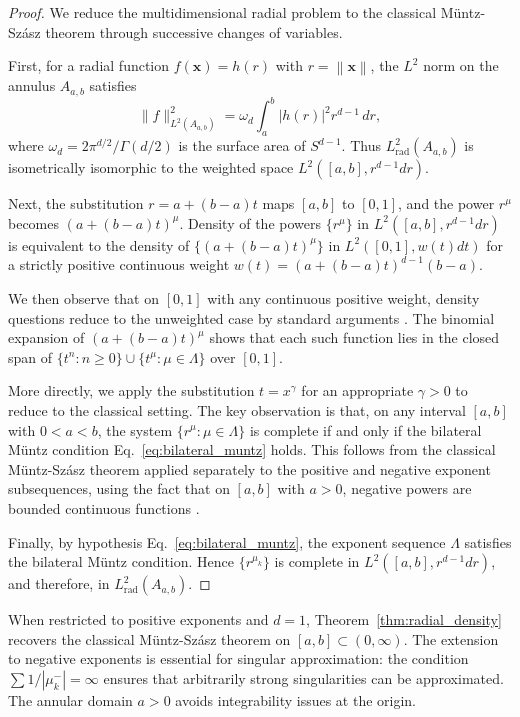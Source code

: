 \documentclass[twoside,11pt]{article}
\newcommand{\bx}{\bm{x}}
\newcommand{\norm}[1]{\left\|#1\right\|}
\renewcommand{\eqref}[1]{Eq.~\ref{#1}}
\begin{document}
\begin{proof}
	We reduce the multidimensional radial problem to the classical Müntz-Szász theorem through successive changes of variables.

	First, for a radial function $f(\bx) = h(r)$ with $r = \norm{\bx}$, the $L^2$ norm on the annulus $A_{a,b}$ satisfies
	\begin{equation}
		\|f\|_{L^2(A_{a,b})}^2 = \omega_d \int_a^b |h(r)|^2 r^{d-1} \, dr,
	\end{equation}
	where $\omega_d = 2\pi^{d/2}/\Gamma(d/2)$ is the surface area of $S^{d-1}$. Thus $L^2_{\mathrm{rad}}(A_{a,b})$ is isometrically isomorphic to the weighted space $L^2([a,b], r^{d-1} dr)$.

	Next, the substitution $r = a + (b-a)t$ maps $[a,b]$ to $[0,1]$, and the power $r^\mu$ becomes $(a + (b-a)t)^\mu$. Density of the powers $\{r^\mu\}$ in $L^2([a,b], r^{d-1} dr)$ is equivalent to the density of $\{(a + (b-a)t)^\mu\}$ in $L^2([0,1], w(t) dt)$ for a strictly positive continuous weight $w(t) = (a + (b-a)t)^{d-1}(b-a)$.

	We then observe that on $[0,1]$ with any continuous positive weight, density questions reduce to the unweighted case by standard arguments \citep[Chapter II]{borwein1995polynomials}. The binomial expansion of $(a + (b-a)t)^\mu$ shows that each such function lies in the closed span of $\{t^n : n \geq 0\} \cup \{t^\mu : \mu \in \Lambda\}$ over $[0,1]$.

	More directly, we apply the substitution $t = x^\gamma$ for an appropriate $\gamma > 0$ to reduce to the classical setting. The key observation is that, on any interval $[a,b]$ with $0 < a < b$, the system $\{r^\mu : \mu \in \Lambda\}$ is complete if and only if the bilateral Müntz condition \eqref{eq:bilateral_muntz} holds. This follows from the classical Müntz-Szász theorem applied separately to the positive and negative exponent subsequences, using the fact that on $[a,b]$ with $a > 0$, negative powers are bounded continuous functions \citep{borwein1995polynomials,almira2007muntz}.

	Finally, by hypothesis \eqref{eq:bilateral_muntz}, the exponent sequence $\Lambda$ satisfies the bilateral Müntz condition. Hence $\{r^{\mu_k}\}$ is complete in $L^2([a,b], r^{d-1} dr)$, and therefore, in $L^2_{\mathrm{rad}}(A_{a,b})$.
\end{proof}

\begin{remark}
	\label{rem:classical_relation}
	When restricted to positive exponents and $d = 1$, Theorem~\ref{thm:radial_density} recovers the classical Müntz-Szász theorem on $[a,b] \subset (0,\infty)$. The extension to negative exponents is essential for singular approximation: the condition $\sum 1/|\mu_k^-| = \infty$ ensures that arbitrarily strong singularities can be approximated. The annular domain $a > 0$ avoids integrability issues at the origin.
\end{remark}
\end{document}
